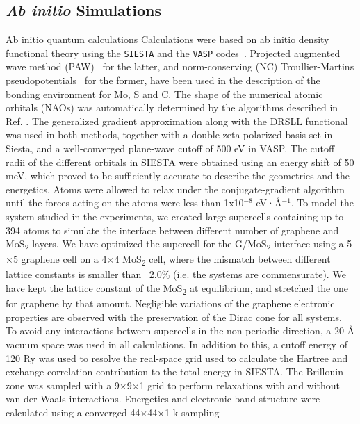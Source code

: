 \subsection*{\textit{Ab initio} Simulations}
\label{sec:ab-init-simul}
Ab initio quantum calculations Calculations were based on ab initio
density functional theory using the
\texttt{SIESTA}\cite{Soler_02_siesta} and the \texttt{VASP}
codes~\cite{Kresse_1996_1,Kresse_1996_2}.  Projected augmented wave
method (PAW)~\cite{Blochl_1994_PW} for the latter, and norm-conserving
(NC) Troullier-Martins pseudo\-potentials~\cite{troullier91} for the
former, have been used in the description of the bonding environment
for Mo, S and C. The shape of the numerical atomic orbitals (NAOs) was
automatically determined by the algorithms described in
Ref. \cite{Soler_02_siesta}. The generalized gradient
approximation\cite{Perdew_1996_GGA} along with the DRSLL
functional\cite{Dion_2004_vdw} was used in both methods, together with
a double-zeta polarized basis set in Siesta, and a well-converged
plane-wave cutoff of 500 eV in VASP. The cutoff radii of the different
orbitals in SIESTA were obtained using an energy shift of 50 meV,
which proved to be sufficiently accurate to describe the geometries
and the energetics. Atoms were allowed to relax under the
conjugate-gradient algorithm until the forces acting on the atoms were
less than 1x10$^{-8}$ eV·Å$^{-1}$.  To model the system studied in the
experiments, we created large supercells containing up to 394 atoms to
simulate the interface between different number of graphene and
MoS\textsubscript{2} layers. We have optimized the supercell for the
G/MoS\textsubscript{2} interface using a 5$\times{}$5 graphene cell on
a 4$\times{}$4 MoS\textsubscript{2} cell, where the mismatch between
different lattice constants is smaller than ~2.0\% (i.e. the systems
are commensurate). We have kept the lattice constant of the
MoS\textsubscript{2} at equilibrium, and stretched the one for
graphene by that amount. Negligible variations of the graphene
electronic properties are observed with the preservation of the Dirac
cone for all systems. To avoid any interactions between supercells in
the non-periodic direction, a 20 Å vacuum space was used in all
calculations. In addition to this, a cutoff energy of 120 Ry was used
to resolve the real-space grid used to calculate the Hartree and
exchange correlation contribution to the total energy in SIESTA. The
Brillouin zone was sampled with a 9×9×1 grid to perform relaxations
with and without van der Waals interactions. Energetics and electronic
band structure were calculated using a converged 44×44×1 k-sampling
